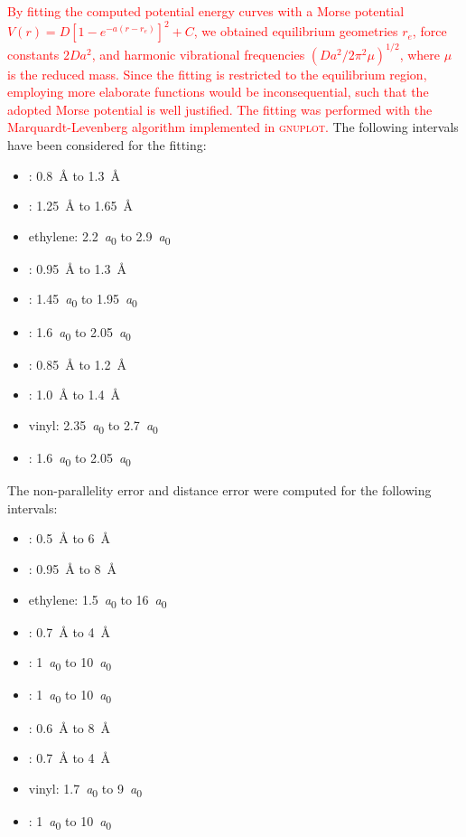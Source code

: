 \documentclass[aip,jcp,preprint,noshowkeys,superscriptaddress]{revtex4-1}
\newcommand{\fk}[1]{\textcolor{red}{#1}}
\begin{document}
\fk{
By fitting the computed potential energy curves with a Morse potential $V(r) = D [1 - e^{-a(r-r_e)}]^2 + C $,
we obtained equilibrium geometries $r_e$, force constants $2Da^2$, and harmonic vibrational frequencies $\left( Da^2/2\pi^2\mu \right)^{1/2}$,
where $\mu$ is the reduced mass.
Since the fitting is restricted to the equilibrium region, employing more elaborate functions would be inconsequential, such that the adopted Morse potential is well justified.
The fitting was performed with the Marquardt-Levenberg algorithm implemented in \textsc{gnuplot}.
}
The following intervals have been considered for the fitting:
\begin{itemize}
\item {}: \SI{0.8}{\angstrom} to \SI{1.3}{\angstrom}
\item {}: \SI{1.25}{\angstrom} to \SI{1.65}{\angstrom}
\item ethylene: \SI{2.2}{\bohr} to \SI{2.9}{\bohr}
\item {}: \SI{0.95}{\angstrom} to \SI{1.3}{\angstrom}
\item {}: \SI{1.45}{\bohr} to \SI{1.95}{\bohr}
\item {}: \SI{1.6}{\bohr} to \SI{2.05}{\bohr}
\item {}: \SI{0.85}{\angstrom} to \SI{1.2}{\angstrom}
\item {}: \SI{1.0}{\angstrom} to \SI{1.4}{\angstrom}
\item vinyl: \SI{2.35}{\bohr} to \SI{2.7}{\bohr}
\item {}: \SI{1.6}{\bohr} to \SI{2.05}{\bohr}
\end{itemize}

\clearpage

The non-parallelity error and distance error were computed for the following intervals:
\begin{itemize}
\item {}: \SI{0.5}{\angstrom} to \SI{6}{\angstrom}
\item {}: \SI{0.95}{\angstrom} to \SI{8}{\angstrom}
\item ethylene: \SI{1.5}{\bohr} to \SI{16}{\bohr}
\item {}: \SI{0.7}{\angstrom} to \SI{4}{\angstrom}
\item {}: \SI{1}{\bohr} to \SI{10}{\bohr}
\item {}: \SI{1}{\bohr} to \SI{10}{\bohr}
\item {}: \SI{0.6}{\angstrom} to \SI{8}{\angstrom}
\item {}: \SI{0.7}{\angstrom} to \SI{4}{\angstrom}
\item vinyl: \SI{1.7}{\bohr} to \SI{9}{\bohr}
\item {}: \SI{1}{\bohr} to \SI{10}{\bohr}
\end{itemize}
\end{document}
